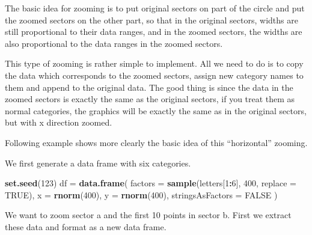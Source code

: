 \documentclass[]{book}
\newenvironment{Shaded}{\begin{snugshade}}{\end{snugshade}}
\newcommand{\KeywordTok}[1]{\textcolor[rgb]{0.13,0.29,0.53}{\textbf{#1}}}
\newcommand{\DataTypeTok}[1]{\textcolor[rgb]{0.13,0.29,0.53}{#1}}
\newcommand{\DecValTok}[1]{\textcolor[rgb]{0.00,0.00,0.81}{#1}}
\newcommand{\StringTok}[1]{\textcolor[rgb]{0.31,0.60,0.02}{#1}}
\newcommand{\OtherTok}[1]{\textcolor[rgb]{0.56,0.35,0.01}{#1}}
\newcommand{\OperatorTok}[1]{\textcolor[rgb]{0.81,0.36,0.00}{\textbf{#1}}}
\newcommand{\NormalTok}[1]{#1}
\begin{document}
The basic idea for zooming is to put original sectors on part of the
circle and put the zoomed sectors on the other part, so that in the
original sectors, widths are still proportional to their data ranges,
and in the zoomed sectors, the widths are also proportional to the data
ranges in the zoomed sectors.

This type of zooming is rather simple to implement. All we need to do is
to copy the data which corresponds to the zoomed sectors, assign new
category names to them and append to the original data. The good thing
is since the data in the zoomed sectors is exactly the same as the
original sectors, if you treat them as normal categories, the graphics
will be exactly the same as in the original sectors, but with x
direction zoomed.

Following example shows more clearly the basic idea of this
``horizontal'' zooming.

We first generate a data frame with six categories.

\begin{Shaded}
\begin{Highlighting}[]
\KeywordTok{set.seed}\NormalTok{(}\DecValTok{123}\NormalTok{)}
\NormalTok{df =}\StringTok{ }\KeywordTok{data.frame}\NormalTok{(}
    \DataTypeTok{factors =} \KeywordTok{sample}\NormalTok{(letters[}\DecValTok{1}\OperatorTok{:}\DecValTok{6}\NormalTok{], }\DecValTok{400}\NormalTok{, }\DataTypeTok{replace =} \OtherTok{TRUE}\NormalTok{),}
    \DataTypeTok{x =} \KeywordTok{rnorm}\NormalTok{(}\DecValTok{400}\NormalTok{),}
    \DataTypeTok{y =} \KeywordTok{rnorm}\NormalTok{(}\DecValTok{400}\NormalTok{),}
    \DataTypeTok{stringsAsFactors =} \OtherTok{FALSE}
\NormalTok{)}
\end{Highlighting}
\end{Shaded}

We want to zoom sector a and the first 10 points in sector b. First we
extract these data and format as a new data frame.

\begin{Shaded}
\end{Shaded}
\end{document}
